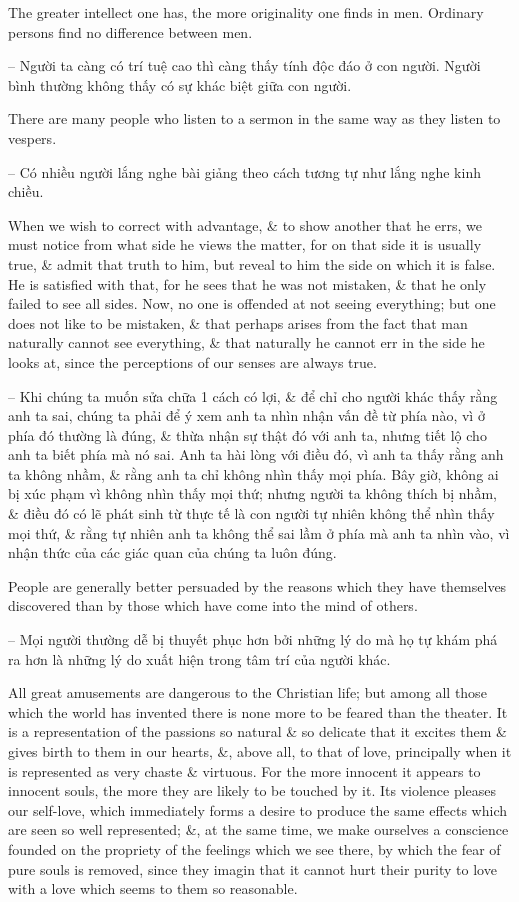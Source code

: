 \documentclass{article}
\begin{document}
\begin{enumerate}
\begin{itemize}
		 The greater intellect one has, the more originality one finds in men. Ordinary persons find no difference between men.
		
		-- Người ta càng có trí tuệ cao thì càng thấy tính độc đáo ở con người. Người bình thường không thấy có sự khác biệt giữa con người.
		
		 There are many people who listen to a sermon in the same way as they listen to vespers.
		
		-- Có nhiều người lắng nghe bài giảng theo cách tương tự như lắng nghe kinh chiều.
		
		 When we wish to correct with advantage, \& to show another that he errs, we must notice from what side he views the matter, for on that side it is usually true, \& admit that truth to him, but reveal to him the side on which it is false. He is satisfied with that, for he sees that he was not mistaken, \& that he only failed to see all sides. Now, no one is offended at not seeing everything; but one does not like to be mistaken, \& that perhaps arises from the fact that man naturally cannot see everything, \& that naturally he cannot err in the side he looks at, since the perceptions of our senses are always true.
		
		-- Khi chúng ta muốn sửa chữa 1 cách có lợi, \& để chỉ cho người khác thấy rằng anh ta sai, chúng ta phải để ý xem anh ta nhìn nhận vấn đề từ phía nào, vì ở phía đó thường là đúng, \& thừa nhận sự thật đó với anh ta, nhưng tiết lộ cho anh ta biết phía mà nó sai. Anh ta hài lòng với điều đó, vì anh ta thấy rằng anh ta không nhầm, \& rằng anh ta chỉ không nhìn thấy mọi phía. Bây giờ, không ai bị xúc phạm vì không nhìn thấy mọi thứ; nhưng người ta không thích bị nhầm, \& điều đó có lẽ phát sinh từ thực tế là con người tự nhiên không thể nhìn thấy mọi thứ, \& rằng tự nhiên anh ta không thể sai lầm ở phía mà anh ta nhìn vào, vì nhận thức của các giác quan của chúng ta luôn đúng.
		
		 People are generally better persuaded by the reasons which they have themselves discovered than by those which have come into the mind of others.
		
		-- Mọi người thường dễ bị thuyết phục hơn bởi những lý do mà họ tự khám phá ra hơn là những lý do xuất hiện trong tâm trí của người khác.
		
		 All great amusements are dangerous to the Christian life; but among all those which the world has invented there is none more to be feared than the theater. It is a representation of the passions so natural \& so delicate that it excites them \& gives birth to them in our hearts, \&, above all, to that of love, principally when it is represented as very chaste \& virtuous. For the more innocent it appears to innocent souls, the more they are likely to be touched by it. Its violence pleases our self-love, which immediately forms a desire to produce the same effects which are seen so well represented; \&, at the same time, we make ourselves a conscience founded on the propriety of the feelings which we see there, by which the fear of pure souls is removed, since they imagin that it cannot hurt their purity to love with a love which seems to them so reasonable.
		

\end{itemize}
\end{enumerate}
\end{document}
